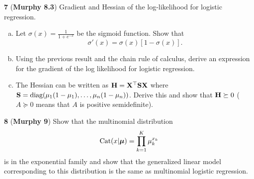 \documentclass[12pt,letterpaper,fleqn]{hmcpset}
\begin{document}
\textbf{7} (\textbf{Murphy 8.3}) Gradient and Hessian of the log-likelihood for
logistic regression.
\begin{enumerate}[(a)]
    \item Let $\sigma(x) = \frac{1}{1 + e^{-x}}$ be the sigmoid function. Show that
        \[
            \sigma'(x) = \sigma(x)\left[1 - \sigma(x)\right].
        \]
    \item Using the previous result and the chain rule of calculus, derive an
        expression for the gradient of the log likelihood for logistic regression.
    \item The Hessian can be written as ${\bf H}={\bf X}^\top{\bf S}{\bf X}$ where ${\bf S} =
        {\hbox{diag}}(\mu_1(1-\mu_1), \dots, \mu_n(1-\mu_n))$. Derive this and show that
        ${\bf H} \succeq 0$ ($A \succeq 0$ means that $A$ is positive semidefinite).
\end{enumerate}

\textbf{8} (\textbf{Murphy 9}) Show that the multinomial distribution
\[
    \text{Cat}(x|\hbox{\boldmath$\mu$}) = \prod_{k=1}^K \mu_k^{x_k}
\]
is in the exponential family and show that the generalized linear model
corresponding to this distribution is the same as multinomial logistic
regression.
\end{document}

